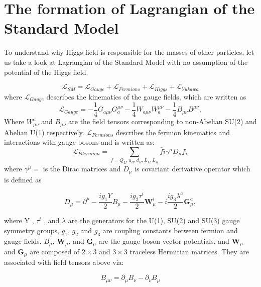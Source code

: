 \section{The formation of Lagrangian of the Standard Model}
To understand why Higgs field is responsible for the masses of other particles, let us take a look at Lagrangian of the Standard Model with no assumption of the potential of the Higgs field.

\begin{equation}
    \mathcal{L}_{SM}= \mathcal{L}_{Gauge}+ \mathcal{L}_{Fermions}+ \mathcal{L}_{Higgs}+ \mathcal{L}_{Yukawa}
  \label{eq:small}
\end{equation}
where $\mathcal{L}_{Gauge}$ describes the kinematics of the gauge fields, which are written as
\begin{equation}
    \mathcal{L}_{Gauge}= -\frac{1}{4}G_{a\mu\nu}G^{\mu\nu}_a - \frac{1}{4}W_{a\mu\nu}W^{\mu\nu}_a - \frac{1}{4}B_{\mu\nu}B^{\mu\nu},
\end{equation}
Where $W_{\mu\nu}^a$ and $B_{\mu\nu}$ are the field tensors corresponding to non-Abelian SU(2) and Abelian U(1) respectively.
$\mathcal{L}_{Fermions}$ describes the fermion kinematics and interactions with gauge bosons and is written as:
\begin{equation}
    \mathcal{L}_{Fdermion}= \sum_{f=Q_L, u_R, d_R, L_L, L_R} \bar{f}i\gamma^{\mu}D_{\mu}f,
    \label{eq:smf}
\end{equation}
where $\gamma^{\mu}=$ is the Dirac matrices and $D_{\mu}$ is covariant derivative operator which is defined as 

\begin{equation}
    D_\mu=\partial^\mu-\frac{ig_1Y}{2}B_\mu-\frac{ig_2\tau^i}{2}\mathbf{W}^i_\mu-i\frac{ig_3\lambda^a}{2}\mathbf{G}^a_\mu,
    \label{eq:dirac}
\end{equation}

where Y , $\tau^i$
, and $\lambda$ are the generators for the U(1), SU(2) and SU(3) gauge symmetry groups,  $g_1$, $g_2$ and $g_3$ 
are coupling constants between fermion and gauge fields. 
$B_\mu$, $\mathbf{W}_\mu$, and $\mathbf{G}_\mu$ are the gauge boson vector potentials,
and $\mathbf{W}_\mu$ and $\mathbf{G}_\mu$ are composed of $2\times3$ and $3\times3$ traceless Hermitian matrices.
They are associated with field tensors above via:

\begin{equation*}
	B_{\mu\nu}=\partial_\mu B_\nu-\partial_\nu B_\mu
\end{equation*}

